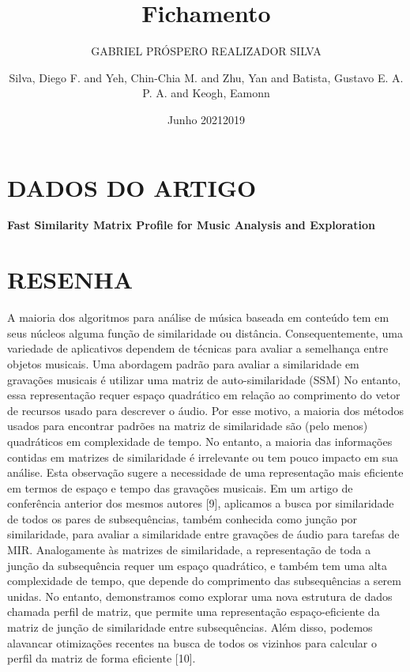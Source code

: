 \documentclass{article}
\title{Fichamento}
\author{GABRIEL PRÓSPERO REALIZADOR  SILVA}
\date{Junho 2021}
\begin{document}
\maketitle

\section{DADOS DO ARTIGO}
\textbf{Fast Similarity Matrix Profile for Music Analysis and Exploration \\}
\author{Silva, Diego F. and Yeh, Chin-Chia M. and Zhu, Yan and Batista, Gustavo E. A. P. A. and Keogh, Eamonn \\}
\date{2019}

\section{RESENHA}
A maioria dos algoritmos para análise de música baseada em conteúdo tem em seus núcleos alguma função de similaridade ou distância. Consequentemente, uma variedade de aplicativos dependem de técnicas para avaliar a semelhança entre objetos musicais.
Uma abordagem padrão para avaliar a similaridade em gravações musicais é utilizar uma matriz de auto-similaridade (SSM)
No entanto, essa representação requer espaço quadrático em relação ao comprimento do vetor de recursos usado para descrever o áudio. Por esse motivo, a maioria dos métodos usados ​​para encontrar padrões na matriz de similaridade são (pelo menos) quadráticos em complexidade de tempo. No entanto, a maioria das informações contidas em matrizes de similaridade é irrelevante ou tem pouco impacto em sua análise. Esta observação sugere a necessidade de uma representação mais eficiente em termos de espaço e tempo das gravações musicais. Em um artigo de conferência anterior dos mesmos autores [9], aplicamos a busca por similaridade de todos os pares de subsequências, também conhecida como junção por similaridade, para avaliar a similaridade entre gravações de áudio para tarefas de MIR. Analogamente às matrizes de similaridade, a representação de toda a junção da subsequência requer um espaço quadrático, e também tem uma alta complexidade de tempo, que depende do comprimento das subsequências a serem unidas. No entanto, demonstramos como explorar uma nova estrutura de dados chamada perfil de matriz, que permite uma representação espaço-eficiente da matriz de junção de similaridade entre subsequências. Além disso, podemos alavancar otimizações recentes na busca de todos os vizinhos para calcular o perfil da matriz de forma eficiente [10].
\end{document}
